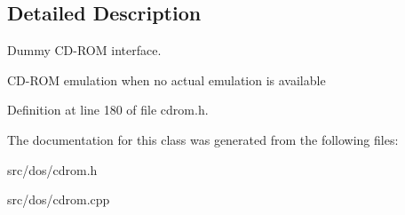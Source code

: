 \subsection{Detailed Description}
Dummy C\-D-\/\-R\-O\-M interface. 

C\-D-\/\-R\-O\-M emulation when no actual emulation is available 

Definition at line 180 of file cdrom.\-h.



The documentation for this class was generated from the following files\-:\begin{DoxyCompactItemize}
\item 
src/dos/cdrom.\-h\item 
src/dos/cdrom.\-cpp\end{DoxyCompactItemize}
